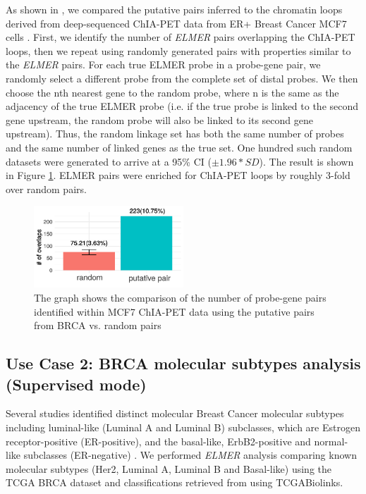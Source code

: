 As shown in , we compared the putative pairs inferred to the chromatin loops derived from deep-sequenced ChIA-PET data from ER+ Breast Cancer MCF7 cells \cite{li2012extensive}. First, we identify the number of \textit{ELMER} pairs overlapping the ChIA-PET loops, then we repeat using randomly generated  pairs with properties similar to the \textit{ELMER} pairs. For each true ELMER probe in a probe-gene pair, we randomly select a different probe from the complete set of distal probes. We then choose the nth nearest gene to the random probe, where n is the same as the adjacency of the true ELMER probe (i.e. if the true probe is linked to the second gene upstream, the  random probe will also be linked to its second gene upstream). Thus, the random linkage set has both the same number of probes and the same number of linked genes as the true set. One hundred such random datasets were generated to arrive at a 95\% CI ($\pm 1.96* SD$).
The result is shown in Figure \ref{fig:chiapet}. ELMER pairs were enriched for ChIA-PET loops by roughly 3-fold over random pairs.



\begin{figure}
\centering
\includegraphics[width=0.5\textwidth]{images/mcf7.pdf}
\caption[MCF7 ChIA-PET validation]{\label{fig:chiapet} The graph shows the comparison of the number of probe-gene pairs identified within MCF7 ChIA-PET data using the putative pairs from BRCA vs. random pairs}
\end{figure}

\subsection{Use Case 2: BRCA molecular subtypes analysis (Supervised mode)}


Several studies identified distinct molecular Breast Cancer molecular subtypes including luminal-like (Luminal A and Luminal B) subclasses, which are Estrogen receptor-positive (ER-positive), and the basal-like, ErbB2-positive and normal-like subclasses (ER-negative) \cite{perou2000molecular,yersal2014biological,sorlie2001gene}. We performed \textit{ELMER} analysis comparing known molecular subtypes (Her2, Luminal A, Luminal B and Basal-like) using the TCGA BRCA dataset and classifications retrieved from \cite{ciriello2015comprehensive} using TCGABiolinks.

